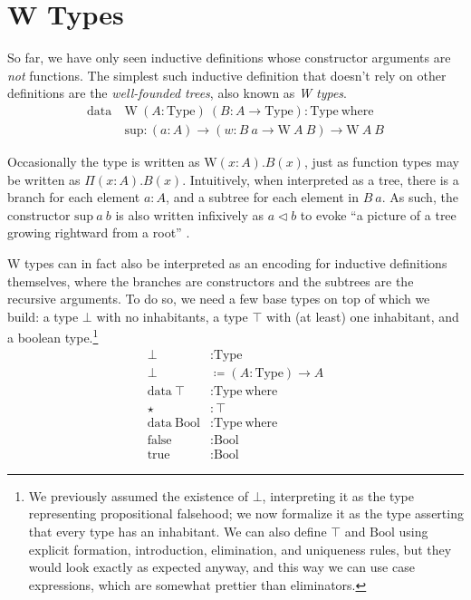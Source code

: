 \documentclass{report}
\newcommand{\Bool}{\const{Bool}}
\newcommand{\true}{\const{true}}
\newcommand{\false}{\const{false}}
\newcommand{\W}{\const{W}}
\renewcommand{\sup}{\const{sup}}
\newcommand{\const}[1]{\text{#1}}
\newcommand{\data}{\const{data}}
\newcommand{\Type}{\const{Type}}
\newcommand{\where}{\const{where}}
\begin{document}
\section{W Types}

So far, we have only seen inductive definitions whose constructor arguments are \emph{not} functions. The simplest such inductive definition that doesn't rely on other definitions are the \emph{well-founded trees}, also known as \emph{W types}.
%
\begin{align*}
    \data ~ &\W ~ (A : \Type) ~ (B: A \to \Type): \Type ~ \where \\
    &\const{sup}: (a: A) \to (w: B ~ a \to \W ~ A ~ B) \to \W ~ A ~ B
\end{align*}

Occasionally the type is written as $\W (x: A). B(x)$, just as function types may be written as $\Pi (x: A). B(x)$. Intuitively, when interpreted as a tree, there is a branch for each element $a: A$, and a subtree for each element in $B ~ a$. As such, the constructor $\sup ~ a ~ b$ is also written infixively as $a \lhd b$ to evoke ``a picture of a tree growing rightward from a root'' \citep{mcbride-wtype}.

W types can in fact also be interpreted as an encoding for inductive definitions themselves, where the branches are constructors and the subtrees are the recursive arguments. To do so, we need a few base types on top of which we build: a type $\bot$ with no inhabitants, a type $\top$ with (at least) one inhabitant, and a boolean type.\footnote{We previously assumed the existence of $\bot$, interpreting it as the type representing propositional falsehood; we now formalize it as the type asserting that every type has an inhabitant. We can also define $\top$ and $\Bool$ using explicit formation, introduction, elimination, and uniqueness rules, but they would look exactly as expected anyway, and this way we can use case expressions, which are somewhat prettier than eliminators.}
%
\begin{align*}
    \bot &: \Type \\
    \bot &\coloneqq (A: \Type) \to A \\
    \data ~ \top &: \Type ~ \where \\
    \star &: \top \\
    \data ~ \Bool &: \Type ~ \where \\
    \false &: \Bool \\
    \true &: \Bool
\end{align*}
\end{document}
